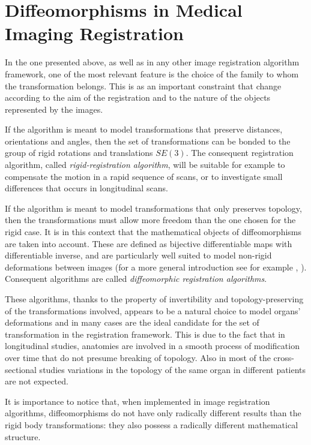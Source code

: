 \section{Diffeomorphisms in Medical Imaging Registration}

In the one presented above, as well as in any other  image registration algorithm framework, one of the most relevant feature is the choice of the family to whom the transformation belongs. This is as an important constraint that change according to the aim of the registration and to the nature of the objects represented by the images. 

If the algorithm is meant to model transformations that preserve distances, orientations and angles, then the set of transformations can be bonded to the group of rigid rotations and translations $SE(3)$. The consequent registration algorithm, called \emph{rigid-registration algorithm}, will be suitable for example to compensate the motion in a rapid sequence of scans, or to investigate small differences that occurs in longitudinal scans.

If the algorithm is meant to model transformations that only preserves topology, then the transformations must allow more freedom than the one chosen for the rigid case. It is in this context that the mathematical objects of diffeomorphisms are taken into account. These are defined as bijective differentiable maps with differentiable inverse, and are particularly well suited to model non-rigid deformations between images (for a more  general introduction see for example \cite{lee2012introduction}, \cite{arnold2006ordinary}). Consequent algorithms are called \emph{diffeomorphic registration algorithms}.

These algorithms, thanks to the property of invertibility and topology-preserving of the transformations involved, appears to be a natural choice to model organs' deformations and in many cases are the ideal candidate for the set of transformation in the registration framework. This is due to the fact that in longitudinal studies, anatomies are involved in a smooth process of modification over time that do not presume breaking of topology. Also in most of the cross-sectional studies variations in the topology of the same organ in different patients are not expected. 

It is importance to notice that, when implemented in image registration algorithms, diffeomorphisms do not have only radically different results than the rigid body transformations: they also possess a radically different mathematical structure.

